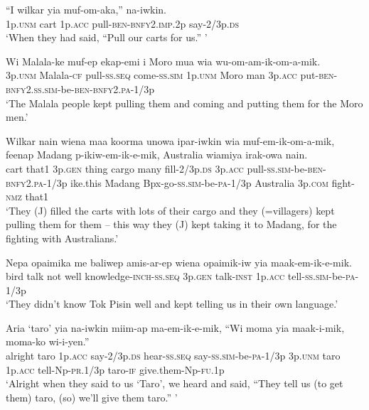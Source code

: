 {\ea\label{ex:a:x38}
\gll  “I  wilkar  yia  muf-om-aka,”  na-iwkin. \\
1p.\textsc{unm}  cart  1p.\textsc{acc}  pull-\textsc{ben}-\textsc{bnfy}2.\textsc{imp}.2p  say-2/3p.\textsc{ds} \\
\glt ‘When they had said, “Pull our carts for us.” ’ \\
\z


\ea\label{ex:a:x39}
\gll  Wi  Malala-ke  muf-ep  ekap-emi  i  Moro mua  wia  wu-om-am-ik-om-a-mik.\\
3p.\textsc{unm}  Malala-\textsc{cf}  pull-\textsc{ss.seq}  come-\textsc{ss}.\textsc{sim}  1p.\textsc{unm}  Moro man  3p.\textsc{acc}  put-\textsc{ben}-\textsc{bnfy}2.\textsc{ss}.\textsc{sim}-be-\textsc{ben}-\textsc{bnfy}2.\textsc{pa}-1/3p \\ 
\glt ‘The Malala people kept pulling them and coming and putting them for the Moro men.’ \\
\z


\ea\label{ex:a:x40}
\gll  Wilkar  nain  wiena  maa  koorma  unowa{  ipar-iwkin} {wia  muf-em-ik-om-a-mik,} {feenap  Madang  p-ikiw-em-ik-e-mik,} {Australia  wiamiya  irak-owa  nain.} \\
cart  that1  3p.\textsc{gen}  thing  cargo  many  fill-2/3p.\textsc{ds} 3p.\textsc{acc}  pull-\textsc{ss}.\textsc{sim}-be-\textsc{ben}-\textsc{bnfy}2.\textsc{pa}-1/3p ike.this  Madang  Bpx-go-\textsc{ss}.\textsc{sim}-be-\textsc{pa}-1/3p Australia  3p.\textsc{com}  fight-\textsc{nmz}  that1\\ 
\glt ‘They (J) filled the carts with lots of their cargo and they (=villagers) kept pulling them for them  – this way they (J) kept taking it to Madang, for the fighting with Australians.’ \\
\z


\ea\label{ex:a:x41}
\gll  Nepa  opaimika  me  baliwep  amis-ar-ep wiena  opaimik-iw  yia  maak-em-ik-e-mik. \\
bird  talk  not  well  knowledge-\textsc{inch}-\textsc{ss.seq} 3p.\textsc{gen}  talk-\textsc{inst}  1p.\textsc{acc}  tell-\textsc{ss}.\textsc{sim}-be-\textsc{pa}-1/3p\\ 
\glt ‘They didn’t know Tok Pisin well and kept telling us in their own language.’ \\
\z


\ea\label{ex:a:x42}
\gll  Aria  ‘taro’  yia  na-iwkin  miim-ap ma-em-ik-e-mik,  “Wi  moma  yia  maak-i-mik,  moma-ko  wi-i-yen.” \\
alright  taro  1p.\textsc{acc}  say-2/3p.\textsc{ds}  hear-\textsc{ss.seq} say-\textsc{ss}.\textsc{sim}-be-\textsc{pa}-1/3p  3p.\textsc{unm}  taro  1p.\textsc{acc} tell-Np-\textsc{pr}.1/3p  taro-\textsc{if}  give.them-Np-\textsc{fu}.1p \\
\glt ‘Alright when they said to us ‘Taro’, we heard and said, “They tell us (to get them) taro, (so) we’ll give them taro.” ’ \\
\z


}
